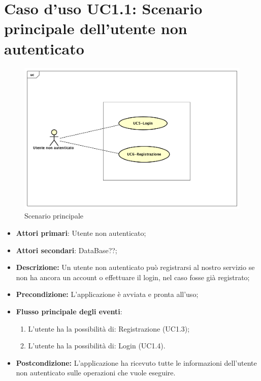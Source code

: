 \section{Caso d'uso UC1.1: Scenario principale dell'utente non autenticato}
\begin{figure} [h]
	\centering
	\includegraphics[scale=0.4]{./Diagram/UC1.png}
	\caption{Scenario principale}\label{}
\end{figure}
\begin{itemize}
	\item \textbf{Attori primari}: Utente non autenticato;
	\item \textbf{Attori secondari}: DataBase??;
	\item \textbf{Descrizione:} Un utente non  autenticato può registrarsi al nostro servizio se non ha ancora un account o effettuare il login, nel caso fosse già registrato;
	\item \textbf{Precondizione:} L'applicazione è avviata e pronta all'uso;
	\item \textbf{Flusso principale degli eventi}:
		\begin{enumerate}
			\item L'utente ha la possibilità di: Registrazione (UC1.3);
			\item L'utente ha la possibilità di: Login (UC1.4).
		\end{enumerate}
		\item \textbf{Postcondizione:} L'applicazione ha ricevuto tutte le informazioni dell'utente non autenticato sulle operazioni che vuole eseguire.
\end{itemize}

